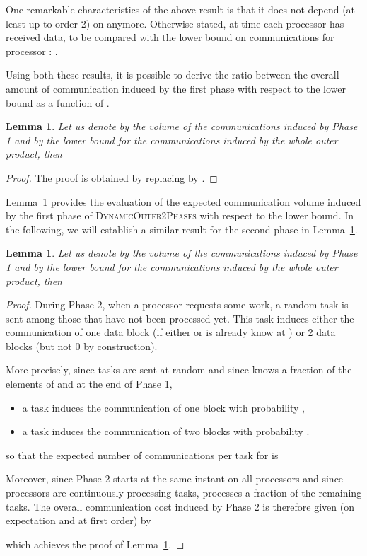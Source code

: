 \documentclass[a4paper,10pt]{article}
\newtheorem{lemma}[theorem]{Lemma}
\newcommand{\stupidthreshold}{\textsc{Dynamic\-Outer\-2Phases}\xspace}
\begin{document}
One remarkable characteristics of the above result is that it does not
depend (at least up to order 2) on  anymore. Otherwise stated, at
time  each processor 
has received 
data, to be compared with the lower bound on communications for
processor : .


Using both these results, it is possible to derive the ratio between the overall amount of communication induced by the first phase with respect to the lower bound as a function of .

\begin{lemma}
\label{lemP1}
Let us denote by  the volume of the
communications induced by Phase 1 and by  the lower bound for the communications induced by the whole outer product, then 

\end{lemma}

\begin{proof} The proof is obtained by replacing  by .
\end{proof}


Lemma~\ref{lemP1} provides the evaluation of the expected
communication volume induced by the first phase of \stupidthreshold
with respect to the lower bound. In the following, we will establish
a similar result for the second phase in Lemma~\ref{lemP2}.


\begin{lemma}
\label{lemP2}
Let us denote by  the volume of the communications induced by Phase 1 and by  the lower bound for the communications induced by the whole outer product, then 

\end{lemma}

\begin{proof} 


  During Phase 2, when a processor  requests some work, a random
  task is sent among those that have not been processed yet. This task
   induces either the communication of one data block (if
  either  or  is already know at ) or 2 data blocks
  (but not 0 by construction).

  More precisely, since tasks are sent at random and since  knows
  a fraction  of the elements of  and  at the end of
  Phase 1,
  \begin{itemize}
  \item a task induces the communication of one block with probability
    ,
  \item a task induces the communication of two blocks with
    probability .
  \end{itemize}
  so that the expected number of communications per task for 
  is
  
 Moreover, since Phase 2 starts at the same
  instant on all processors and since processors are continuously
  processing tasks,  processes a fraction  of the
   remaining tasks. The overall communication cost
  induced by Phase 2 is therefore given (on expectation and at first
  order) by
  
  which achieves the proof of Lemma~\ref{lemP2}.
\end{proof}
\end{document}
